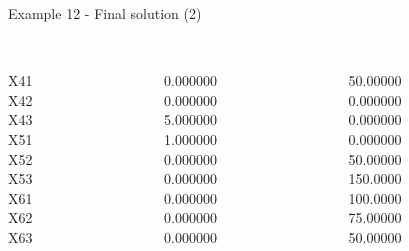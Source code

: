 \begin{frame}{Example 12 - Final solution (2)}
\footnotesize
\begin{columns}[t]
\begin{column}{0.3\textwidth}
\\
X41\\
X42\\
X43\\
X51\\
X52\\
X53\\
X61\\
X62\\
X63\\
\end{column}
\begin{column}{0.3\textwidth}
\\
0.000000\\
0.000000\\
5.000000\\
1.000000\\
0.000000\\
0.000000\\
0.000000\\
0.000000\\
0.000000\\
\end{column}

\begin{column}{0.3\textwidth}
\\
50.00000\\
0.000000\\
0.000000\\
0.000000\\
50.00000\\
150.0000\\
100.0000\\
75.00000\\
50.00000\\
\end{column}
\end{columns}
\end{frame}

